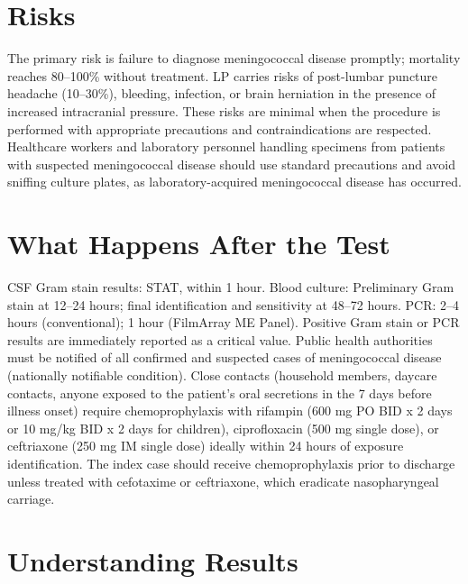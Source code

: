 \section*{Risks}
The primary risk is failure to diagnose meningococcal disease promptly; mortality reaches 80--100\% without treatment. LP carries risks of post-lumbar puncture headache (10--30\%), bleeding, infection, or brain herniation in the presence of increased intracranial pressure. These risks are minimal when the procedure is performed with appropriate precautions and contraindications are respected. Healthcare workers and laboratory personnel handling specimens from patients with suspected meningococcal disease should use standard precautions and avoid sniffing culture plates, as laboratory-acquired meningococcal disease has occurred.

\section*{What Happens After the Test}
CSF Gram stain results: STAT, within 1 hour. Blood culture: Preliminary Gram stain at 12--24 hours; final identification and sensitivity at 48--72 hours. PCR: 2--4 hours (conventional); 1 hour (FilmArray ME Panel). Positive Gram stain or PCR results are immediately reported as a critical value. Public health authorities must be notified of all confirmed and suspected cases of meningococcal disease (nationally notifiable condition). Close contacts (household members, daycare contacts, anyone exposed to the patient's oral secretions in the 7 days before illness onset) require chemoprophylaxis with rifampin (600 mg PO BID x 2 days or 10 mg/kg BID x 2 days for children), ciprofloxacin (500 mg single dose), or ceftriaxone (250 mg IM single dose) ideally within 24 hours of exposure identification. The index case should receive chemoprophylaxis prior to discharge unless treated with cefotaxime or ceftriaxone, which eradicate nasopharyngeal carriage.

\section*{Understanding Results}

